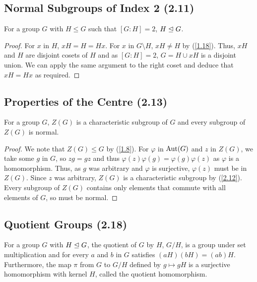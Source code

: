 \subsection{Normal Subgroups of Index 2 (2.11)} \label{2.11}

For a group $G$ with $H \leq G$ such that $[G : H] = 2$, $H \trianglelefteq G$.

\begin{proof}
    For $x$ in $H$, $xH = H = Hx$.
    For $x$ in $G \setminus H$, $xH \neq H$ by (\ref{1.18}).
    Thus, $xH$ and $H$ are disjoint cosets of $H$ and as $[G : H] = 2$, 
    $G = H \cup xH$ is a disjoint union. We can apply the same argument 
    to the right coset and deduce that $xH = Hx$ as required.
\end{proof}

\subsection{Properties of the Centre (2.13)} \label{2.13}

For a group $G$, $Z(G)$ is a characteristic subgroup of $G$ and every
subgroup of $Z(G)$ is normal.


\begin{proof}
    We note that $Z(G) \leq G$ by (\ref{1.8}). For $\varphi$ in $\operatorname{Aut}(G)$ and $z$
    in $Z(G)$, we take some $g$ in $G$, so $zg = gz$ and thus 
    $\varphi(z)\varphi(g) = \varphi(g)\varphi(z)$ as 
    $\varphi$ is a homomorphism. Thus, as $g$ was arbitrary and $\varphi$ is surjective, 
    $\varphi(z)$ must be in $Z(G)$. Since $z$ was arbitrary, $Z(G)$
    is a characteristic subgroup by (\ref{2.12}).
    \\[\baselineskip]
    Every subgroup of $Z(G)$ contains only elements that commute with
    all elements of $G$, so must be normal.
\end{proof}

\subsection{Quotient Groups (2.18)} \label{2.18}

For a group $G$ with $H \trianglelefteq G$, the quotient of $G$ by $H$, 
$G / H$, is a group under
set multiplication and for every $a$ and $b$ in $G$ satisfies
$(aH)(bH) = (ab)H$. Furthermore, the map $\pi$ from $G$ to $G / H$
defined by $g \mapsto gH$ is a surjective homomorphism with
kernel $H$, called the quotient homomorphism.

